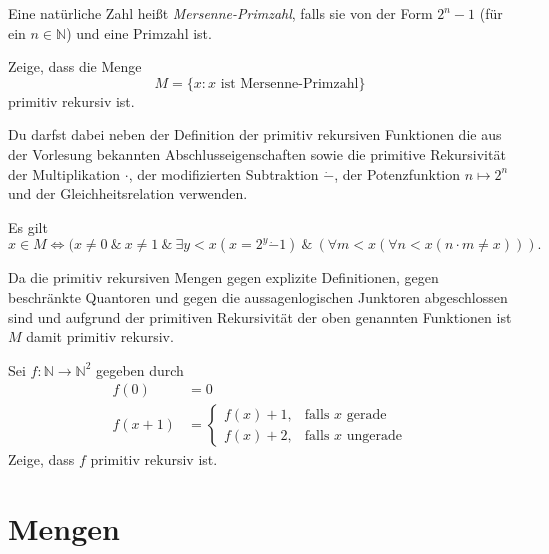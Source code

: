 \documentclass[german,headsepline]{scrartcl}
\theoremstyle{definition}
\begin{document}
	\begin{question}[subtitle={Nachklausur 2013}]
		Eine natürliche Zahl heißt \emph{Mersenne-Primzahl}, falls sie von der Form $2^n-1$ (für ein $n\in\mathbb{N}$) und eine Primzahl ist.
		
		Zeige, dass die Menge
		\[M=\{x\colon x\text{ ist Mersenne-Primzahl}\}\]
		primitiv rekursiv ist.
		
		Du darfst dabei neben der Definition der primitiv rekursiven Funktionen die aus der Vorlesung bekannten Abschlusseigenschaften sowie die primitive Rekursivität der Multiplikation $\cdot$, der modifizierten Subtraktion $\dot{-}$, der Potenzfunktion $n\mapsto2^n$ und der Gleichheitsrelation verwenden.
	\end{question}
	\begin{solution}
		Es gilt
		\[x\in M\Leftrightarrow(x\neq0~\&~x\neq1~\&~\exists y<x(x=2^y\dot{-}1)~\&~(\forall m<x(\forall n<x(n\cdot m\neq x))).\]
		
		Da die primitiv rekursiven Mengen gegen explizite Definitionen,
		gegen beschränkte Quantoren und gegen die aussagenlogischen Junktoren abgeschlossen sind
		und aufgrund der primitiven Rekursivität der oben genannten Funktionen
		ist $M$ damit primitiv rekursiv.
	\end{solution}
	
	\begin{question}[subtitle={Blatt 13, 2015}]
		Sei $f:\mathbb{N}\to\mathbb{N}^2$ gegeben durch
		\begin{align*}
			f(0) &= 0 \\
			f(x+1) &= \begin{cases}
				f(x)+1, &\text{falls $x$ gerade} \\
				f(x)+2, &\text{falls $x$ ungerade}
			\end{cases}
		\end{align*}
		Zeige, dass $f$ primitiv rekursiv ist.
	\end{question}
	
	\newpage
	\section{Mengen}
\end{document}
